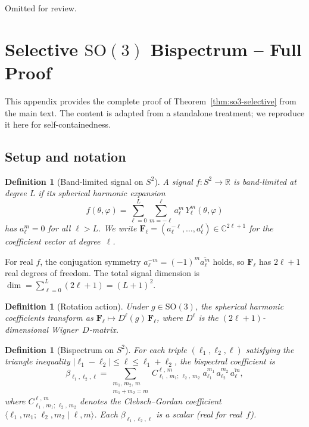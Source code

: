 \documentclass{article}
\newtheorem{definition}[theorem]{Definition}
\newcommand{\R}{\mathbb{R}}
\newcommand{\C}{\mathbb{C}}
\newcommand{\SO}{\mathrm{SO}}
\newcommand{\SH}{Y}
\newcommand{\CG}[6]{C^{#5,\,#6}_{#1,\,#2;\,#3,\,#4}}
\newcommand{\abs}[1]{\lvert #1 \rvert}
\newcommand{\conj}[1]{\overline{#1}}
\begin{document}
\begin{ack}
Omitted for review.
\end{ack}




\appendix

\section{Selective $\SO(3)$ Bispectrum -- Full Proof}
\label{app:so3-proof}

This appendix provides the complete proof of Theorem~\ref{thm:so3-selective}
from the main text. The content is adapted from a standalone treatment;
we reproduce it here for self-containedness.

\subsection{Setup and notation}

\begin{definition}[Band-limited signal on $S^2$]
A signal $f : S^2 \to \R$ is \emph{band-limited} at degree $L$ if its
spherical harmonic expansion
\begin{equation}\label{eq:app-sh-expansion}
  f(\theta, \varphi)
  = \sum_{\ell=0}^{L} \sum_{m=-\ell}^{\ell}
    a_\ell^m \, \SH_\ell^m(\theta, \varphi)
\end{equation}
has $a_\ell^m = 0$ for all $\ell > L$. We write
$\mathbf{F}_\ell = (a_\ell^{-\ell}, \dotsc, a_\ell^{\ell})
  \in \C^{2\ell+1}$
for the coefficient vector at degree~$\ell$.
\end{definition}

\noindent
For real $f$, the conjugation symmetry
$a_\ell^{-m} = (-1)^m \conj{a_\ell^m}$ holds, so
$\mathbf{F}_\ell$ has $2\ell+1$ real degrees of freedom.
The total signal dimension is
$\dim = \sum_{\ell=0}^{L}(2\ell+1) = (L+1)^2$.

\begin{definition}[Rotation action]
Under $g \in \SO(3)$, the spherical harmonic coefficients transform as
$\mathbf{F}_\ell \mapsto D^\ell(g)\,\mathbf{F}_\ell$,
where $D^\ell$ is the $(2\ell+1)$-dimensional Wigner~$D$-matrix.
\end{definition}

\begin{definition}[Bispectrum on $S^2$]\label{def:app-bispectrum}
For each triple $(\ell_1, \ell_2, \ell)$ satisfying the triangle
inequality $\abs{\ell_1 - \ell_2} \le \ell \le \ell_1 + \ell_2$,
the \emph{bispectral coefficient} is
\begin{equation}\label{eq:app-bispectrum}
  \beta_{\ell_1,\ell_2,\ell}
  = \sum_{\substack{m_1,\,m_2,\,m \\ m_1+m_2=m}}
    \CG{\ell_1}{m_1}{\ell_2}{m_2}{\ell}{m}\;
    a_{\ell_1}^{m_1}\,a_{\ell_2}^{m_2}\,\conj{a_\ell^m},
\end{equation}
where $\CG{\ell_1}{m_1}{\ell_2}{m_2}{\ell}{m}$ denotes the
Clebsch--Gordan coefficient
$\langle \ell_1, m_1;\, \ell_2, m_2 \mid \ell, m \rangle$.
Each $\beta_{\ell_1,\ell_2,\ell}$ is a scalar (real for real~$f$).
\end{definition}
\end{document}
